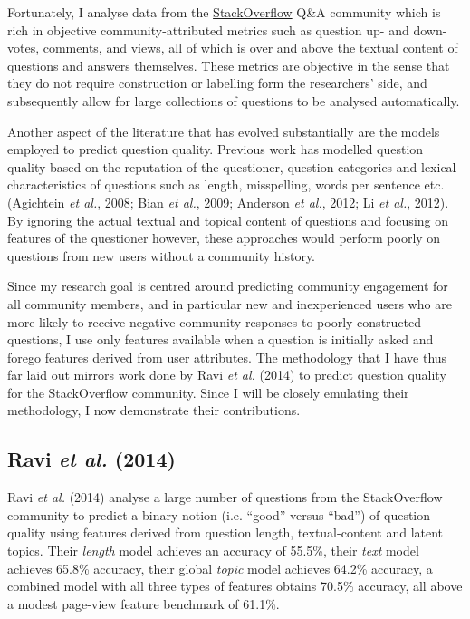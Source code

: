 \documentclass[11pt,preprint, authoryear]{article}
\begin{document}
Fortunately, I analyse data from the
\href{https://StackOverflow.com}{StackOverflow} Q\&A community which is
rich in objective community-attributed metrics such as question up- and
down-votes, comments, and views, all of which is over and above the
textual content of questions and answers themselves. These metrics are
objective in the sense that they do not require construction or
labelling form the researchers' side, and subsequently allow for large
collections of questions to be analysed automatically.

Another aspect of the literature that has evolved substantially are the
models employed to predict question quality. Previous work has modelled
question quality based on the reputation of the questioner, question
categories and lexical characteristics of questions such as length,
misspelling, words per sentence etc. (Agichtein \emph{et al.}, 2008;
Bian \emph{et al.}, 2009; Anderson \emph{et al.}, 2012; Li \emph{et
al.}, 2012). By ignoring the actual textual and topical content of
questions and focusing on features of the questioner however, these
approaches would perform poorly on questions from new users without a
community history.

Since my research goal is centred around predicting community engagement
for all community members, and in particular new and inexperienced users
who are more likely to receive negative community responses to poorly
constructed questions, I use only features available when a question is
initially asked and forego features derived from user attributes. The
methodology that I have thus far laid out mirrors work done by Ravi
\emph{et al.} (2014) to predict question quality for the StackOverflow
community. Since I will be closely emulating their methodology, I now
demonstrate their contributions.

\subsection{\texorpdfstring{Ravi \emph{et al.} (2014)
\label{ravi}}{Ravi et al. (2014) }}\label{ravi2014}

Ravi \emph{et al.} (2014) analyse a large number of questions from the
StackOverflow community to predict a binary notion (i.e. ``good'' versus
``bad'') of question quality using features derived from question
length, textual-content and latent topics. Their \emph{length} model
achieves an accuracy of 55.5\%, their \emph{text} model achieves 65.8\%
accuracy, their global \emph{topic} model achieves 64.2\% accuracy, a
combined model with all three types of features obtains 70.5\% accuracy,
all above a modest page-view feature benchmark of 61.1\%.
\end{document}
